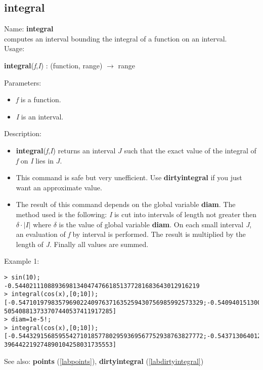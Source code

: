 \subsection{integral}
\label{labintegral}
\noindent Name: \textbf{integral}\\
computes an interval bounding the integral of a function on an interval.\\

\noindent Usage: 
\begin{center}
\textbf{integral}(\emph{f},\emph{I}) : (\textsf{function}, \textsf{range}) $\rightarrow$ \textsf{range}\\
\end{center}
Parameters: 
\begin{itemize}
\item \emph{f} is a function.
\item \emph{I} is an interval.
\end{itemize}
\noindent Description: \begin{itemize}

\item \textbf{integral}(\emph{f},\emph{I}) returns an interval $J$ such that the exact value of 
   the integral of \emph{f} on \emph{I} lies in $J$.

\item This command is safe but very unefficient. Use \textbf{dirtyintegral} if you just want
   an approximate value.

\item The result of this command depends on the global variable \textbf{diam}.
   The method used is the following: \emph{I} is cut into intervals of length not 
   greater then $\delta \cdot |I|$ where $\delta$ is the value
   of global variable \textbf{diam}.
   On each small interval \emph{J}, an evaluation of \emph{f} by interval is
   performed. The result is multiplied by the length of \emph{J}. Finally all values 
   are summed.
\end{itemize}
\noindent Example 1: 
\begin{center}\begin{minipage}{15cm}\begin{Verbatim}[frame=single]
> sin(10);
-0.544021110889369813404747661851377281683643012916219
> integral(cos(x),[0;10]);
[-0.547101979835796902240976371635259430756985992573329;-0.540940151300131838481
505408813733707440537411917285]
> diam=1e-5!;
> integral(cos(x),[0;10]);
[-0.544329156859554271018577802959369567752938763827772;-0.543713064012499695080
396442219274890104258031735553]
\end{Verbatim}
\end{minipage}\end{center}
See also: \textbf{points} (\ref{labpoints}), \textbf{dirtyintegral} (\ref{labdirtyintegral})
